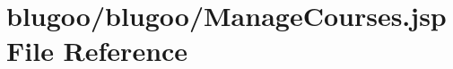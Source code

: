 \hypertarget{ManageCourses_8jsp}{
\section{blugoo/blugoo/ManageCourses.jsp File Reference}
\label{ManageCourses_8jsp}
}


